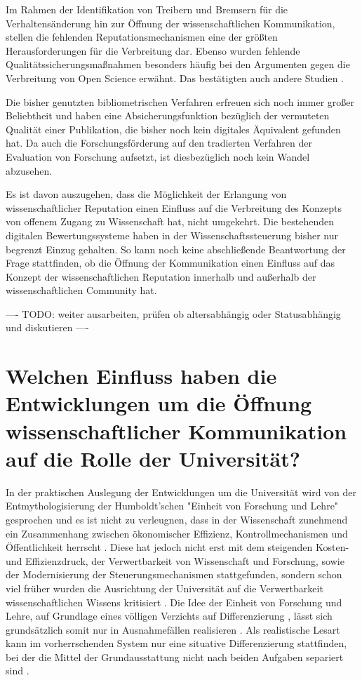 Im Rahmen der Identifikation von Treibern und Bremsern für die Verhaltensänderung hin zur Öffnung der wissenschaftlichen Kommunikation, stellen die fehlenden Reputationsmechanismen eine der größten Herausforderungen für die Verbreitung dar. Ebenso wurden fehlende Qualitätssicherungsmaßnahmen besonders häufig bei den Argumenten gegen die Verbreitung von Open Science erwähnt. Das bestätigten auch andere Studien \cite{eu_open_science_2015}.

Die bisher genutzten bibliometrischen Verfahren erfreuen sich noch immer großer Beliebtheit und haben eine Absicherungsfunktion bezüglich der vermuteten Qualität einer Publikation, die bisher noch kein digitales Äquivalent gefunden hat. Da auch die Forschungsförderung auf den tradierten Verfahren der Evaluation von Forschung aufsetzt, ist diesbezüglich noch kein Wandel abzusehen.

Es ist davon auszugehen, dass die Möglichkeit der Erlangung von wissenschaftlicher Reputation einen Einfluss auf die Verbreitung des Konzepts von offenem Zugang zu Wissenschaft hat, nicht umgekehrt. Die bestehenden digitalen Bewertungssysteme haben in der Wissenschaftssteuerung bisher nur begrenzt Einzug gehalten. So kann noch keine abschließende Beantwortung der Frage stattfinden, ob die Öffnung der Kommunikation einen Einfluss auf das Konzept der wissenschaftlichen Reputation innerhalb und außerhalb der wissenschaftlichen Community hat.

---- TODO: weiter ausarbeiten, prüfen ob altersabhängig oder Statusabhängig und diskutieren ----

\section{Welchen Einfluss haben die Entwicklungen um die Öffnung wissenschaftlicher Kommunikation auf die Rolle der Universität?}

In der praktischen Auslegung der Entwicklungen um die Universität wird von der Entmythologisierung der Humboldt’schen "Einheit von Forschung und Lehre" gesprochen \cite{binswanger_2014_excellence} \cite[:299]{Schimank_2001} \cite[:343]{Kruecken_2001} und es ist nicht zu verleugnen, dass in der Wissenschaft zunehmend ein Zusammenhang zwischen ökonomischer Effizienz, Kontrollmechanismen und Öffentlichkeit herrscht \cite[:27]{Reinhart_intransparenz_2006} \cite{foucault_1977_uberwachen}. Diese hat jedoch nicht erst mit dem steigenden Kosten- und Effizienzdruck, der Verwertbarkeit von Wissenschaft und Forschung, sowie der Modernisierung der Steuerungsmechanismen stattgefunden, sondern schon viel früher wurden die Ausrichtung der Universität auf die Verwertbarkeit wissenschaftlichen Wissens kritisiert \cite{Huber_2005}. Die Idee der Einheit von Forschung und Lehre, auf Grundlage eines völligen Verzichts auf Differenzierung \cite{kittler_2004}, lässt sich grundsätzlich somit nur in Ausnahmefällen realisieren \cite{Schimank_2001}. Als realistische Lesart kann im vorherrschenden System nur eine situative Differenzierung stattfinden, bei der die Mittel der Grundausstattung nicht nach beiden Aufgaben separiert sind \cite{Schimank_2001}.

